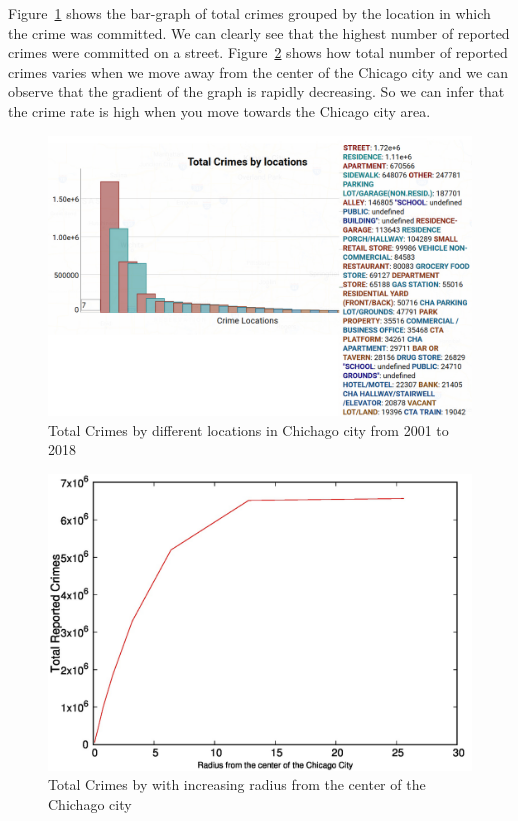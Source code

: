 Figure~\ref{fig:year-top10crimes-local-geo3} shows the bar-graph of
total crimes grouped by the location in which the crime was
committed. We can clearly see that the highest number of reported
crimes were committed on a
street. Figure~\ref{fig:crimes-with-radius-geo4} shows how total
number of reported crimes varies when we move away from the center of
the Chicago city and we can observe that the gradient of the graph is
rapidly decreasing. So we can infer that the crime rate is high when
you move towards the Chicago city area.

\begin{figure}[htb]
	\centering\includegraphics[width=\columnwidth]{images/geo3.jpg}
	\caption{Total Crimes by different locations in Chichago city
        from 2001 to 2018}\label{fig:year-top10crimes-local-geo3}
\end{figure}

\begin{figure}[htb]
	\centering\includegraphics[width=\columnwidth]{images/geo4.jpg}
	\caption{Total Crimes by with increasing radius from the center
        of the Chichago city}\label{fig:crimes-with-radius-geo4}
\end{figure}

